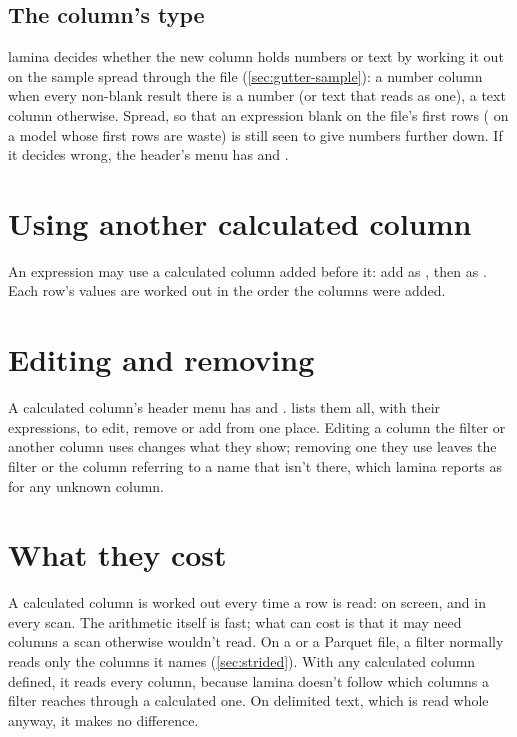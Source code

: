 \subsection{The column's type}\label{sec:calc-type}

lamina decides whether the new column holds numbers or text by working it out on the sample spread
through the file (\cref{sec:gutter-sample}): a number column when every non-blank result there is a
number (or text that reads as one), a text column otherwise. Spread, so that an expression blank on the
file's first rows ( on a model whose first rows are waste) is still
seen to give numbers further down. If it decides wrong, the header's menu has  and
.

\section{Using another calculated column}

An expression may use a calculated column added before it: add  as , then  as . Each row's values are worked out in the order
the columns were added.

\section{Editing and removing}\label{sec:calc-manager}

A calculated column's header menu has  and . 
lists them all, with their expressions, to edit, remove or add from one place. Editing a column the
filter or another column uses changes what they show; removing one they use leaves the filter or the
column referring to a name that isn't there, which lamina reports as for any unknown column.

\section{What they cost}\label{sec:calc-cost}

A calculated column is worked out every time a row is read: on screen, and in every scan. The arithmetic
itself is fast; what can cost is that it may need columns a scan otherwise wouldn't read. On a
 or a Parquet file, a filter normally reads only the columns it names (\cref{sec:strided}). With
any calculated column defined, it reads every column, because lamina doesn't follow which columns a
filter reaches through a calculated one. On delimited text, which is read whole anyway, it makes no
difference.

